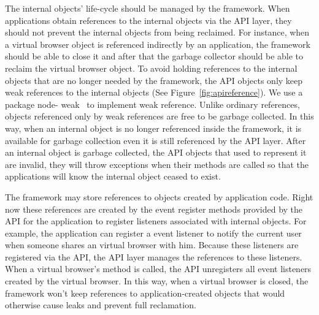 The internal objects' life-cycle should be managed by the framework.
When applications obtain references to the internal objects via the API
layer, they should not prevent the internal objects from being reclaimed.
For instance, when a virtual browser object is referenced indirectly by
an application, the framework should be able to close it and after that
the garbage collector should be able to reclaim the virtual browser object.
To avoid holding references to the internal objects that are no longer needed
by the framework, the API objects only keep weak references to the internal
objects (See Figure~\ref{fig:apireference}). We use a \nodejs{} package node-
weak~\cite{nodeweak} to implement weak reference. Unlike ordinary references,
objects referenced only by weak references are free to be garbage
collected.
In this way, when an internal object is no longer referenced
inside the framework, it is available for garbage collection even 
it is still referenced by the API layer.
After an internal object is garbage collected, the API objects that used to 
represent it are invalid, they
will throw exceptions when their methods are called so that
 the applications will know the internal object ceased to exist.


\apireferencefig{}

The framework may store references to objects created by application
code.  Right now these references are created by the event register methods
provided by the API for the application to register listeners associated with internal
objects. For example, the application can register a event listener to notify
the current user when someone shares an virtual browser with him.  Because these
listeners are registered via the API, the API layer manages the references to these
listeners. When a virtual browser's  method is called, the API
unregisters all event listeners created by the virtual browser. In this
way, when a virtual browser is closed, the framework won't keep references
to application-created objects that would otherwise cause leaks and prevent
full reclamation.


